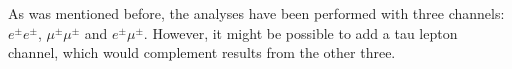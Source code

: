 As was mentioned before, the analyses have been performed with three channels: $e^{\pm}e^{\pm}$, $\mu^{\pm}\mu^{\pm}$ and $e^{\pm}\mu^{\pm}$. However, it might be possible to add a tau lepton channel, which would complement results from the other three. 





